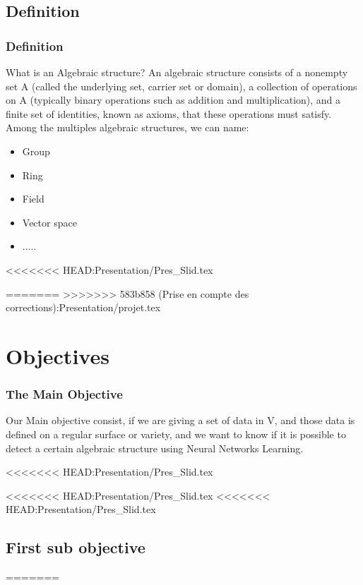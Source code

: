 \documentclass{beamer}
\begin{document}
\subsection{Definition}
\begin{frame}
    \frametitle{Definition}
    What is an Algebraic structure? An algebraic structure consists of a nonempty set A (called the underlying set, carrier set or domain), a collection of operations on A (typically binary operations such as addition and multiplication), and a finite set of identities, known as axioms, that these operations must satisfy.
    Among the multiples algebraic structures, we can name:
    \begin{itemize}
        \item Group
        \item Ring
        \item Field
        \item Vector space
        \item .....
    \end{itemize}
\end{frame}
<<<<<<< HEAD:Presentation/Pres_Slid.tex

=======
>>>>>>> 583b858 (Prise en compte des corrections):Presentation/projet.tex
\section{Objectives}
\begin{frame}
    \frametitle{The Main Objective}
    Our Main objective consist,  if we are giving a set of data in V, and those data is defined on a regular surface or variety, and we want to know if it is possible to detect a certain algebraic structure using Neural Networks Learning.
\end{frame}
<<<<<<< HEAD:Presentation/Pres_Slid.tex

<<<<<<< HEAD:Presentation/Pres_Slid.tex
<<<<<<< HEAD:Presentation/Pres_Slid.tex
\subsection{First sub objective} 
=======
\end{document}
